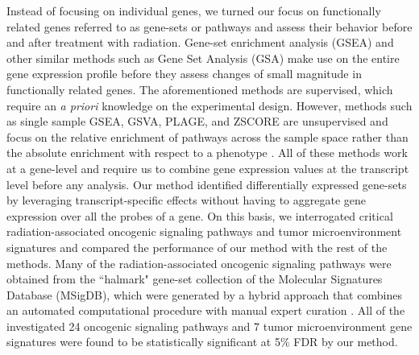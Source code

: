\documentclass[hidelinks,11pt]{article}
\begin{document}
Instead of focusing on individual genes, we turned our focus on functionally related genes referred to as gene-sets or pathways and assess their behavior before and after treatment with radiation. Gene-set enrichment analysis (GSEA) and other similar methods such as Gene Set Analysis (GSA) make use on the entire gene expression profile before they assess changes of small magnitude in functionally related genes. The aforementioned methods are supervised, which require an \emph{a priori} knowledge on the experimental design. However, methods such as single sample GSEA, GSVA, PLAGE, and ZSCORE are unsupervised and focus on the relative enrichment of pathways across the sample space rather than the absolute enrichment with respect to a phenotype \cite{gsva}. All of these methods work at a gene-level and require us to combine gene expression values at the transcript level before any analysis. Our method identified differentially expressed gene-sets by leveraging transcript-specific effects without having to aggregate gene expression over all the probes of a gene. On this basis, we interrogated critical radiation-associated oncogenic signaling pathways and tumor microenvironment signatures and compared the performance of our method with the rest of the methods. Many of the radiation-associated oncogenic signaling pathways were obtained from the ``halmark" gene-set collection of the Molecular Signatures Database (MSigDB), which were generated by a hybrid approach that combines an automated computational procedure with manual expert curation \cite{msigdb_hm}. All of the investigated 24 oncogenic signaling pathways and 7 tumor microenvironment gene signatures were found to be statistically significant at 5\% FDR by our method. 
\end{document}
